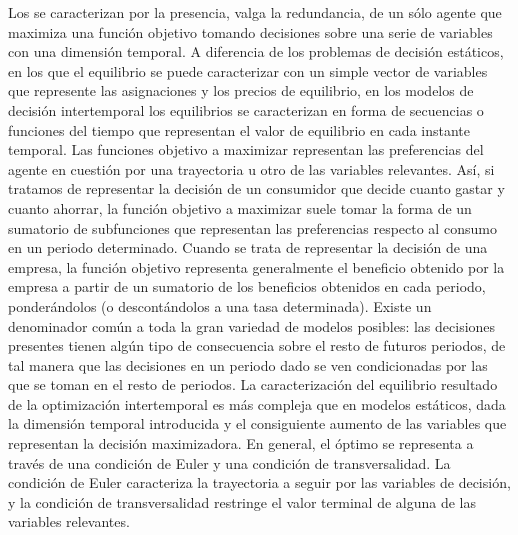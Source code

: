 \documentclass{nuevotema}
\begin{document}
Los  se caracterizan por la presencia, valga la redundancia, de un sólo agente que maximiza una función objetivo tomando decisiones sobre una serie de variables con una dimensión temporal. A diferencia de los problemas de decisión estáticos, en los que el equilibrio se puede caracterizar con un simple vector de variables que represente las asignaciones y los precios de equilibrio, en los modelos de decisión intertemporal los equilibrios se caracterizan en forma de secuencias o funciones del tiempo que representan el valor de equilibrio en cada instante temporal. Las funciones objetivo a maximizar representan las preferencias del agente en cuestión por una trayectoria u otro de las variables relevantes. Así, si tratamos de representar la decisión de un consumidor que decide cuanto gastar y cuanto ahorrar, la función objetivo a maximizar suele tomar la forma de un sumatorio de subfunciones que representan las preferencias respecto al consumo en un periodo determinado. Cuando se trata de representar la decisión de una empresa, la función objetivo representa generalmente el beneficio obtenido por la empresa a partir de un sumatorio de los beneficios obtenidos en cada periodo, ponderándolos (o descontándolos a una tasa determinada). Existe un denominador común a toda la gran variedad de modelos posibles: las decisiones presentes tienen algún tipo de consecuencia sobre el resto de futuros periodos, de tal manera que las decisiones en un periodo dado se ven condicionadas por las que se toman en el resto de periodos. La caracterización del equilibrio resultado de la optimización intertemporal es más compleja que en modelos estáticos, dada la dimensión temporal introducida y el consiguiente aumento de las variables que representan la decisión maximizadora. En general, el óptimo se representa a través de una condición de Euler y una condición de transversalidad. La condición de Euler caracteriza la trayectoria a seguir por las variables de decisión, y la condición de transversalidad restringe el valor terminal de alguna de las variables relevantes.
\end{document}
